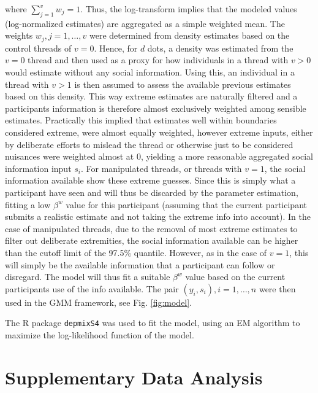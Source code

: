 \documentclass[9pt,a4paper,twocolumn,lineno]{article}
\begin{document}
where $\sum_{j=1}^v w_j = 1$. Thus, the log-transform implies that the modeled values (log-normalized estimates) are aggregated as a simple weighted mean. The weights $w_j, j=1,\dots,v$ were determined from density estimates based on the control threads of $v=0$. Hence, for $d$ dots, a density was estimated from the $v=0$ thread and then used as a proxy for how individuals in a thread with $v>0$ would estimate without any social information. Using this, an individual in a thread with $v>1$ is then assumed to assess the available previous estimates based on this density. This way extreme estimates are naturally filtered and a participants information is therefore almost exclusively weighted among sensible estimates. Practically this implied that estimates well within boundaries considered extreme, were almost equally weighted, however extreme inputs, either by deliberate efforts to mislead the thread or otherwise just to be considered nuisances were weighted almost at 0, yielding a more reasonable aggregated social information input $s_i$. For manipulated threads, or threads with $v=1$, the social information available show these extreme guesses. Since this is simply what a participant have seen and will thus be discarded by the parameter estimation, fitting a low $\beta^w$ value for this participant (assuming that the current participant submits a realistic estimate and not taking the extreme info into account). In the case of manipulated threads, due to the removal of most extreme estimates to filter out deliberate extremities, the social information available can be higher than the cutoff limit of the 97.5\% quantile. However, as in the case of $v=1$, this will simply be the available information that a participant can follow or disregard. The model will thus fit a suitable $\beta^w$ value based on the current participants use of the info available. The pair $(y_i,s_i), i=1,\dots,n$ were then used in the GMM framework, see Fig. \ref{fig:model}.

The R package \texttt{depmixS4} \cite{visser2010} was used to fit the model, using an EM algorithm to maximize the log-likelihood function of the model. 

\section*{Supplementary Data Analysis}
\end{document}
